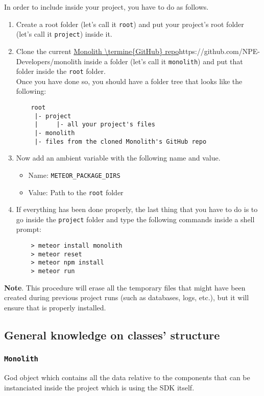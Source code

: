 In order to include  inside your  project, you have to do as follows.
\begin{enumerate}
	\item Create a root folder (let's call it \texttt{root}) and put your project's root folder (let's call it \texttt{project}) inside it.
	
	\item Clone the current \url{Monolith \termine{GitHub} repo}{https://github.com/NPE-Developers/monolith} inside a folder (let's call it \texttt{monolith}) and put that folder inside the \texttt{root} folder. \\
Once you have done so, you should have a folder tree that looks like the following:
	\begin{lstlisting}
    root
     |- project
     |     |- all your project's files
     |- monolith
     |- files from the cloned Monolith's GitHub repo

	\end{lstlisting}
	
	\item Now add an ambient variable with the following name and value.
	\begin{itemize}
		\item Name: \texttt{METEOR\_PACKAGE\_DIRS}
		\item Value:  Path to the \texttt{root} folder
	\end{itemize}

	\item If everything has been done properly, the last thing that you have to do is to go inside the \texttt{project} folder and type the following commands inside a shell prompt:
	\begin{lstlisting}
    > meteor install monolith
    > meteor reset
    > meteor npm install
    > meteor run
	\end{lstlisting}

\end{enumerate}

\textbf{Note}. This procedure will erase all the temporary files that might have been created during previous project runs (such as databases, logs, etc.), but it will ensure that  is properly installed.


\subsection{General knowledge on classes' structure}
\subsubsection{\texttt{Monolith}}
God object which contains all the data relative to the components that can be instanciated inside the project which is using the SDK itself.

